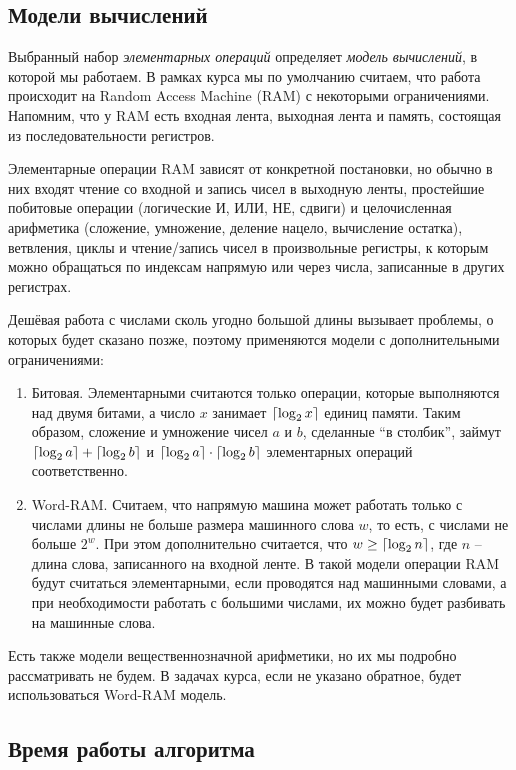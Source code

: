 \documentclass{article}
\begin{document}
\subsection*{Модели вычислений}
Выбранный набор \textit{элементарных операций} определяет \textit{модель вычислений}, в которой мы работаем. В рамках курса мы по умолчанию считаем, что работа происходит на Random Access Machine (RAM) с некоторыми ограничениями. Напомним, что у RAM есть входная лента, выходная лента и память, состоящая из последовательности регистров.

Элементарные операции RAM зависят от конкретной постановки, но обычно в них входят чтение со входной и запись чисел в выходную ленты, простейшие побитовые операции (логические И, ИЛИ, НЕ, сдвиги) и целочисленная арифметика (сложение, умножение, деление нацело, вычисление остатка), ветвления, циклы и чтение/запись чисел в произвольные регистры, к которым можно обращаться по индексам напрямую или через числа, записанные в других регистрах.

Дешёвая работа с числами сколь угодно большой длины вызывает проблемы, о которых будет сказано позже, поэтому применяются модели с дополнительными ограничениями:
\begin{enumerate}
    \item Битовая. Элементарными считаются только операции, которые выполняются над двумя битами, а число $x$ занимает $\lceil\log_2 x\rceil$ единиц памяти. Таким образом, сложение и умножение чисел $a$ и $b$, сделанные ``в столбик'', займут $\lceil\log_2 a\rceil + \lceil\log_2 b\rceil$ и $\lceil\log_2 a\rceil \cdot \lceil\log_2 b\rceil$ элементарных операций соответственно.
    \item Word-RAM. Считаем, что напрямую машина может работать только с числами длины не больше размера машинного слова $w$, то есть, с числами не больше $2^w$. При этом дополнительно считается, что $w \geq \lceil\log_2 n\rceil$, где $n$ -- длина слова, записанного на входной ленте. В такой модели операции RAM будут считаться элементарными, если проводятся над машинными словами, а при необходимости работать с большими числами, их можно будет разбивать на машинные слова.
\end{enumerate}

Есть также модели вещественнозначной арифметики, но их мы подробно рассматривать не будем. В задачах курса, если не указано обратное, будет использоваться Word-RAM модель. 

\subsection*{Время работы алгоритма}
\end{document}
